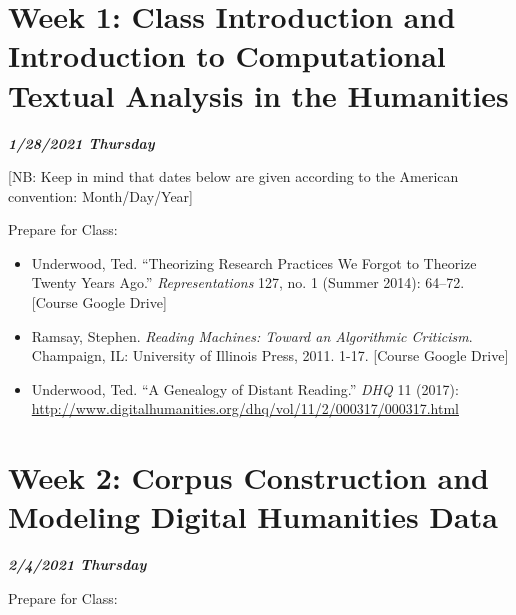 \documentclass[
]{book}
\providecommand{\tightlist}{%
  \setlength{\itemsep}{0pt}\setlength{\parskip}{0pt}}
\begin{document}
\hypertarget{week-1-class-introduction-and-introduction-to-computational-textual-analysis-in-the-humanities}{%
\chapter{Week 1: Class Introduction and Introduction to Computational Textual Analysis in the Humanities}\label{week-1-class-introduction-and-introduction-to-computational-textual-analysis-in-the-humanities}}

\textbf{\emph{1/28/2021 Thursday}}

{[}NB: Keep in mind that dates below are given according to the American convention: Month/Day/Year{]}

Prepare for Class:

\begin{itemize}
\tightlist
\item
  Underwood, Ted. ``Theorizing Research Practices We Forgot to Theorize Twenty Years Ago.'' \emph{Representations} 127, no. 1 (Summer 2014): 64--72. {[}Course Google Drive{]}
\item
  Ramsay, Stephen. \emph{Reading Machines: Toward an Algorithmic Criticism}. Champaign, IL: University of Illinois Press, 2011. 1-17. {[}Course Google Drive{]}
\item
  Underwood, Ted. ``A Genealogy of Distant Reading.'' \emph{DHQ} 11 (2017): \url{http://www.digitalhumanities.org/dhq/vol/11/2/000317/000317.html}
\end{itemize}

\hypertarget{week-2-corpus-construction-and-modeling-digital-humanities-data-1}{%
\chapter{Week 2: Corpus Construction and Modeling Digital Humanities Data}\label{week-2-corpus-construction-and-modeling-digital-humanities-data-1}}

\textbf{\emph{2/4/2021 Thursday}}

Prepare for Class:
\end{document}

